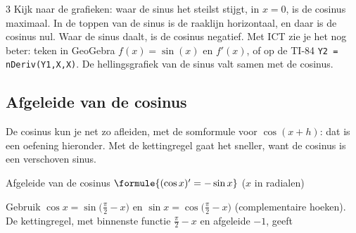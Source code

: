 \begin{alleenvoor}{3}
Kijk naar de grafieken: waar de sinus het steilst stijgt, in $x = 0$, is de cosinus maximaal. In de toppen van de sinus is de raaklijn horizontaal, en daar is de cosinus nul. Waar de sinus daalt, is de cosinus negatief. Met ICT zie je het nog beter: teken in GeoGebra $f(x) = \sin(x)$ en $f'(x)$, of op de TI-84 \texttt{Y2 = nDeriv(Y1,X,X)}. De hellingsgrafiek van de sinus valt samen met de cosinus.



\begin{oefeningen}
\end{oefeningen}

\subsection{Afgeleide van de cosinus}

De cosinus kun je net zo afleiden, met de somformule voor $\cos(x + h)$: dat is een oefening hieronder. Met de kettingregel gaat het sneller, want de cosinus is een verschoven sinus.

\begin{theorie}
\begin{stelling}{Afgeleide van de cosinus}
$\formule{(\cos x)' = -\sin x}$ \qquad ($x$ in radialen)
\end{stelling}
\begin{bewijs}
Gebruik $\cos x = \sin\bigl(\frac{\pi}{2} - x\bigr)$ en $\sin x = \cos\bigl(\frac{\pi}{2} - x\bigr)$ (complementaire hoeken). De kettingregel, met binnenste functie $\frac{\pi}{2} - x$ en afgeleide $-1$, geeft
\end{bewijs}
\end{theorie}


\end{alleenvoor}
